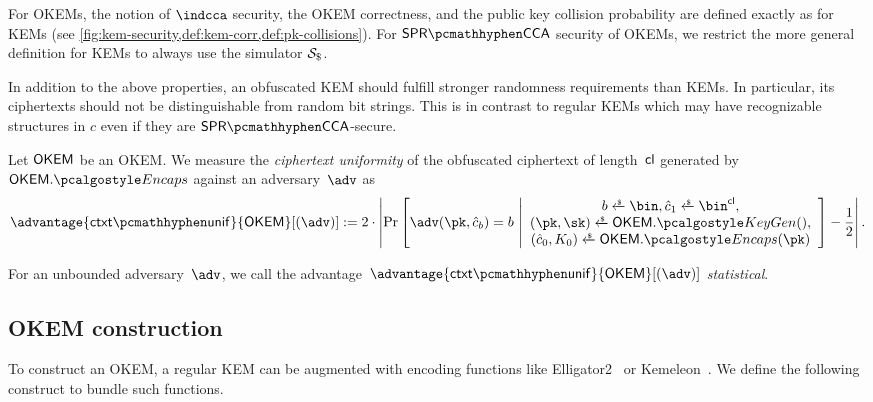 For OKEMs, the notion of $\indcca$ security, the OKEM correctness, and the public key collision probability are defined exactly as for KEMs (see \cref{fig:kem-security,def:kem-corr,def:pk-collisions}). For $\sprcca$ security of OKEMs, we restrict the more general definition for KEMs to always use the simulator $\simulbin$.

In addition to the above properties, an obfuscated KEM should fulfill stronger randomness requirements than KEMs. In particular, its ciphertexts should not be distinguishable from random bit strings. This is in contrast to regular KEMs which may have recognizable structures in $c$ even if they are $\sprcca$-secure.

\begin{definition}
\label{def:ctxt-uniformity}
    Let $\mathsf{OKEM}$ be an OKEM.
    We measure the \emph{ciphertext uniformity} of the obfuscated ciphertext of length~$\mathsf{cl}$ generated by $\OKEM.\encaps$ against an adversary~$\adv$ as
    \[
        \advantage{\ctxtunif}{\OKEM}[(\adv)] := 
        2 \cdot \left|
        \Pr\left[
            \adv(\pk, \hat c_b) = b
        ~\middle|
            \begin{array}{c}
                b \getsr \bin, \hat c_1 \getsr \bin^{\obfctxtlen}, \\
                (\pk,\sk) \getsr \OKEM.\kgen(),\\
                (\hat c_0, K_0) \getsr \OKEM.\encaps(\pk)
            \end{array}
        \right]
        - \frac{1}{2}
        \right|.
    \]
    
    For an unbounded adversary~$\adv$, we call the advantage~$\advantage{\ctxtunif}{\OKEM}[(\adv)] $ \emph{statistical}.
\end{definition}

\subsection{OKEM construction}

To construct an OKEM, a regular KEM can be augmented with encoding functions like \textsf{Elligator2}~\cite{CCS:BHKL13} or \textsf{Kemeleon}~\cite[Sec. 2.4]{CCS:GunSteVei24}. We define the following construct to bundle such functions.

